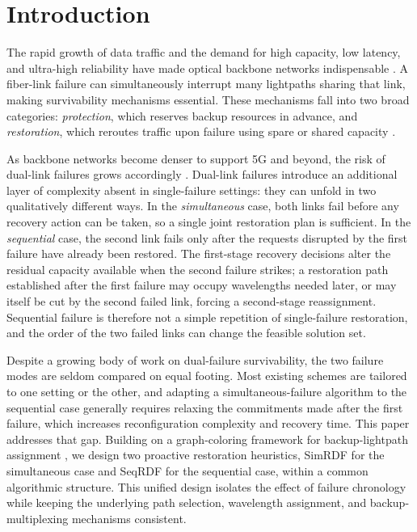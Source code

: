\documentclass[conference]{IEEEtran}
\begin{document}
\IEEEpeerreviewmaketitle


\section{Introduction}
\label{sec: intro}

The rapid growth of data traffic and the demand for high capacity, low latency, and ultra-high reliability have made optical backbone networks indispensable \cite{gomes2018boosting,moubayed2023otn,tezergil2022wireless}. A fiber-link failure can simultaneously interrupt many lightpaths sharing that link, making survivability mechanisms essential. These mechanisms fall into two broad categories: \emph{protection}, which reserves backup resources in advance, and \emph{restoration}, which reroutes traffic upon failure using spare or shared capacity \cite{miladic2021review}.

As backbone networks become denser to support 5G and beyond, the risk of dual-link failures grows accordingly \cite{gangopadhyay20195g, frederick2004evaluating,Basak2022protection}. Dual-link failures introduce an additional layer of complexity absent in single-failure settings: they can unfold in two qualitatively different ways. In the \emph{simultaneous} case, both links fail before any recovery action can be taken, so a single joint restoration plan is sufficient. In the \emph{sequential} case, the second link fails only after the requests disrupted by the first failure have already been restored. The first-stage recovery decisions alter the residual capacity available when the second failure strikes; a restoration path established after the first failure may occupy wavelengths needed later, or may itself be cut by the second failed link, forcing a second-stage reassignment. Sequential failure is therefore not a simple repetition of single-failure restoration, and the order of the two failed links can change the feasible solution set.

Despite a growing body of work on dual-failure survivability, the two failure modes are seldom compared on equal footing. Most existing schemes are tailored to one setting or the other, and adapting a simultaneous-failure algorithm to the sequential case generally requires relaxing the commitments made after the first failure, which increases reconfiguration complexity and recovery time. This paper addresses that gap. Building on a graph-coloring framework for backup-lightpath assignment \cite{Jaumard2026AGraphColoring}, we design two proactive restoration heuristics, SimRDF for the simultaneous case and SeqRDF for the sequential case, within a common algorithmic structure. This unified design isolates the effect of failure chronology while keeping the underlying path selection, wavelength assignment, and backup-multiplexing mechanisms consistent.
\end{document}
